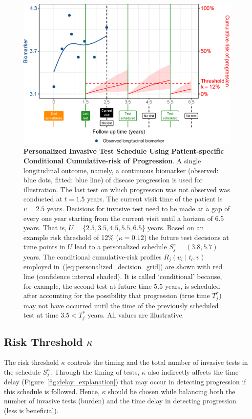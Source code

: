 \begin{figure}
\centerline{\includegraphics{images/schedule_explanation_102.eps}}
\caption{\textbf{Personalized Invasive Test Schedule Using Patient-specific Conditional Cumulative-risk of Progression}.  A single longitudinal outcome, namely, a continuous biomarker (observed: blue dots, fitted: blue line) of disease progression is used for illustration. The last test on which progression was not observed was conducted at $t=1.5$ years. The current visit time of the patient is $v=2.5$ years. Decisions for invasive test need to be made at a gap of every one year starting from the current visit until a horizon of 6.5 years. That is, $U=\{2.5, 3.5, 4.5, 5.5, 6.5\}$ years. Based on an example risk threshold of 12\% ($\kappa=0.12$) the future test decisions at time points in $U$ lead to a personalized schedule $S_j^\kappa = (3.8, 5.7)$ years. The conditional cumulative-risk profiles $R_j(u_l \mid t_l, v)$ employed in~(\ref{eq:personalized_decision_grid}) are shown with red line (confidence interval shaded). It is called `conditional' because, for example, the second test at future time 5.5 years, is scheduled after accounting for the possibility that progression (true time $T^*_j$) may not have occurred until the time of the previously scheduled test at time $3.5 < T^*_j$ years. All values are illustrative.} 
\label{fig:schedule_explanation}
\end{figure}

\subsection{Risk Threshold $\kappa$}
The risk threshold $\kappa$ controls the timing and the total number of invasive tests in the schedule $S_j^{\kappa}$. Through the timing of tests, $\kappa$ also indirectly affects the time delay (Figure~\ref{fig:delay_explanation}) that may occur in detecting progression if this schedule is followed. Hence, $\kappa$ should be chosen while balancing both the number of invasive tests (burden) and the time delay in detecting progression (less is beneficial).


